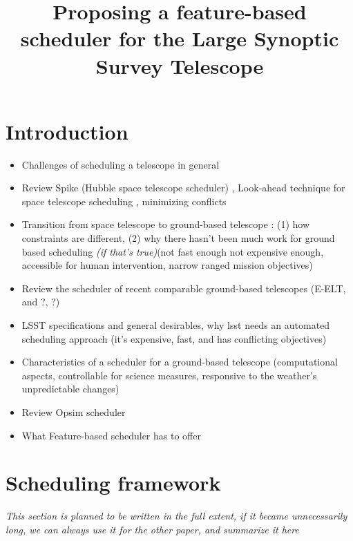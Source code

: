 \documentclass[12pt]{article}
\theoremstyle{definition}
\begin{document}
\title{Proposing a feature-based scheduler for the Large Synoptic Survey Telescope}
\maketitle
\section{Introduction} \label{sec:intro}

\begin{itemize}
\item Challenges of scheduling a telescope in general
\item Review Spike (Hubble space telescope scheduler) \cite{johnston1994spike}, Look-ahead technique for space telescope scheduling \cite{sadeh1991look}, minimizing conflicts \cite{minton1992minimizing}
\item Transition from space telescope to ground-based telescope : (1) how constraints are different, (2) why there hasn't been much work for ground based scheduling \textit{(if that's true)}(not fast enough not expensive enough, accessible for human intervention, narrow ranged mission objectives)
\item Review the scheduler of recent comparable ground-based telescopes (E-ELT, and ?, ?)
\item LSST specifications and general desirables, why lsst needs an automated scheduling approach (it's expensive, fast, and has conflicting objectives)
\item Characteristics of a scheduler for a ground-based telescope (computational aspects, controllable for science measures, responsive to the weather's unpredictable changes)
\item Review Opsim scheduler \cite{delgado2016lsst}
\item What Feature-based scheduler has to offer
\end{itemize}
 
 
\section{Scheduling framework}\label{sec_SM}
\textit{This section is planned to be written in the full extent, if it became unnecessarily long, we can always use it for the other paper, and summarize it here}
\end{document}

